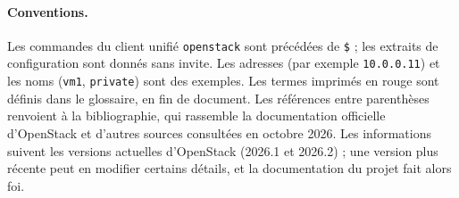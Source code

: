 \paragraph{Conventions.} Les commandes du client unifié \texttt{openstack} sont précédées de \texttt{\$} ; les extraits de
configuration sont donnés sans invite. Les adresses (par exemple \texttt{10.0.0.11}) et les noms (\texttt{vm1}, \texttt{private}) sont des
exemples. Les termes imprimés en rouge sont définis dans le glossaire, en fin de document. Les références entre parenthèses renvoient à la bibliographie, qui rassemble la documentation officielle
d'OpenStack \parencite{openstack-docs} et d'autres sources consultées en octobre 2026. Les informations suivent les versions
actuelles d'OpenStack (2026.1 et 2026.2) ; une version plus récente peut en modifier certains détails, et la documentation du
projet fait alors foi.

